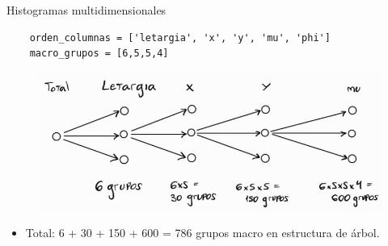 \documentclass[aspectratio=169,english]{beamer}
\begin{document}
\begin{frame}[fragile]{Histogramas multidimensionales}

    \begin{verbatim}
    orden_columnas = ['letargia', 'x', 'y', 'mu', 'phi']
    macro_grupos = [6,5,5,4]
    \end{verbatim}

    \begin{figure}
        \centering
        \includegraphics[width=0.7\linewidth]{imagens/esquema3.jpeg}
        \label{fig:esquema31}
    \end{figure}

    \begin{itemize}
        \item Total: 6 + 30 + 150 + 600 = 786 grupos macro en estructura de árbol.
    \end{itemize}

\end{frame}
\end{document}
